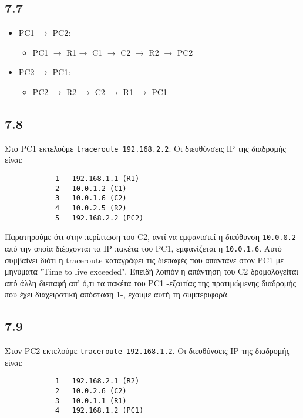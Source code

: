 \documentclass[a4paper, 12pt]{article}
\begin{document}
	\subsection*{7.7}
		\begin{itemize}
			\item PC1 $\rightarrow$ PC2: 
				\begin{itemize}
					\item PC1 $\rightarrow$ R1$\rightarrow$ C1 $\rightarrow$ C2 $\rightarrow$ R2 $\rightarrow$ PC2
				\end{itemize} 
			\item PC2 $\rightarrow$ PC1: 
				\begin{itemize}
					\item PC2 $\rightarrow$ R2 $\rightarrow$ C2 $\rightarrow$ R1 $\rightarrow$ PC1
				\end{itemize}
		\end{itemize}

	\subsection*{7.8}
		Στο PC1 εκτελούμε \verb|traceroute 192.168.2.2|. Οι διευθύνσεις IP της διαδρομής είναι:
		
		\begin{verbatim}
			1   192.168.1.1 (R1)
			2   10.0.1.2 (C1)
			3   10.0.1.6 (C2)
			4   10.0.2.5 (R2)
			5   192.168.2.2 (PC2)
		\end{verbatim}
		
		Παρατηρούμε ότι στην περίπτωση του C2, αντί να εμφανιστεί η διεύθυνση \verb|10.0.0.2| από την οποία διέρχονται τα IP πακέτα του PC1, εμφανίζεται η \verb|10.0.1.6|. Αυτό συμβαίνει διότι η traceroute καταγράφει τις διεπαφές που απαντάνε στον PC1 με μηνύματα "Time to live exceeded". Επειδή λοιπόν η απάντηση του C2 δρομολογείται από άλλη διεπαφή απ' ό,τι τα πακέτα του PC1 -εξαιτίας της προτιμώμενης διαδρομής που έχει διαχειρστική απόσταση 1-, έχουμε αυτή τη συμπεριφορά.

	\subsection*{7.9}
		Στον PC2 εκτελούμε \verb|traceroute 192.168.1.2|. Οι διευθύνσεις IP της διαδρομής είναι:
		
		\begin{verbatim}
			1   192.168.2.1 (R2)
			2   10.0.2.6 (C2)
			3   10.0.1.1 (R1)
			4   192.168.1.2 (PC1)
		\end{verbatim}
		
\end{document}

